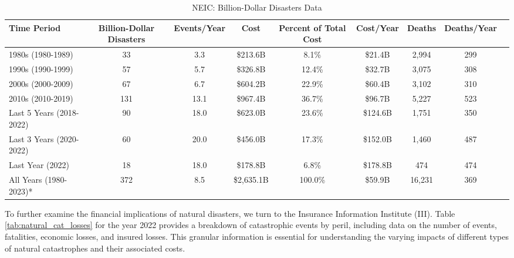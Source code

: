 \documentclass[12pt]{article}
\begin{document}
\begin{table}[h]
  \label{tab:bil_dol_disasters} 
    \centering
    \begin{tabular}{|l|c|c|c|c|c|c|c|c|}
    \hline
    Time Period & Billion-Dollar Disasters & Events/Year & Cost & Percent of Total Cost & Cost/Year & Deaths & Deaths/Year \\
    \hline
    1980s (1980-1989) & 33 & 3.3 & \$213.6B & 8.1\% & \$21.4B & 2,994 & 299 \\
    1990s (1990-1999) & 57 & 5.7 & \$326.8B & 12.4\% & \$32.7B & 3,075 & 308 \\
    2000s (2000-2009) & 67 & 6.7 & \$604.2B & 22.9\% & \$60.4B & 3,102 & 310 \\
    2010s (2010-2019) & 131 & 13.1 & \$967.4B & 36.7\% & \$96.7B & 5,227 & 523 \\
    Last 5 Years (2018-2022) & 90 & 18.0 & \$623.0B & 23.6\% & \$124.6B & 1,751 & 350 \\
    Last 3 Years (2020-2022) & 60 & 20.0 & \$456.0B & 17.3\% & \$152.0B & 1,460 & 487 \\
    Last Year (2022) & 18 & 18.0 & \$178.8B & 6.8\% & \$178.8B & 474 & 474 \\
    All Years (1980-2023)* & 372 & 8.5 & \$2,635.1B & 100.0\% & \$59.9B & 16,231 & 369 \\
    \hline
    \end{tabular}
    \caption{NEIC: Billion-Dollar Disasters Data}
    \cite{ncei}
\end{table}

To further examine the financial implications of natural disasters, we turn to the Insurance Information Institute (III)\cite{iii}. 
Table \ref{tab:natural_cat_losses} for the year 2022 provides a breakdown of catastrophic events by peril, including data on the 
number of events, fatalities, economic losses, and insured losses. This granular information is essential for understanding the 
varying impacts of different types of natural catastrophes and their associated costs.
\end{document}
